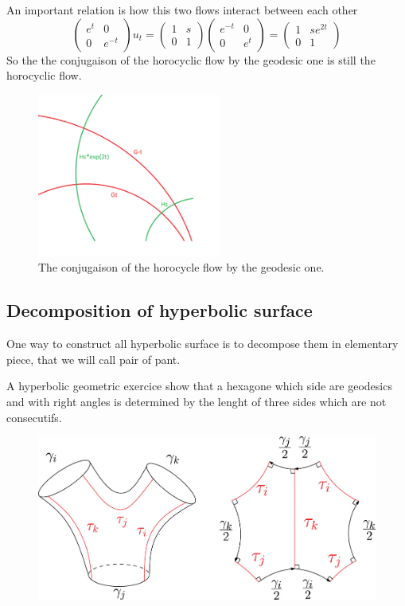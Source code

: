 An important relation is how this two flows interact between each other \[
\begin{pmatrix} e^t & 0 \\ 0 & e^{-t}\end{pmatrix} u_t=\begin{pmatrix} 1 & s \\ 0 & 1 \end{pmatrix} \begin{pmatrix} e^{-t} & 0 \\ 0 & e^{t}\end{pmatrix}=
\begin{pmatrix} 1 & s e^{2t} \\ 0 & 1\end{pmatrix}
\]
So the the conjugaison of the horocyclic flow by the geodesic one is still the horocyclic flow.

\begin{figure}[h!]
\centering
\includegraphics[width=6cm]{Image/Commutatoin.png}
\caption{The conjugaison of the horocycle flow by the geodesic one.}
\end{figure}


\subsection{Decomposition of hyperbolic surface}

One way to construct all hyperbolic surface is to decompose them in elementary piece, that we will call pair of pant.

A hyperbolic geometric exercice show that a hexagone which side are geodesics and with right angles is determined by the lenght of three sides which are not consecutifs.

\begin{figure}
\centering
\includegraphics[width=12cm]{Image/PairOfPant.jpg}
\end{figure}

